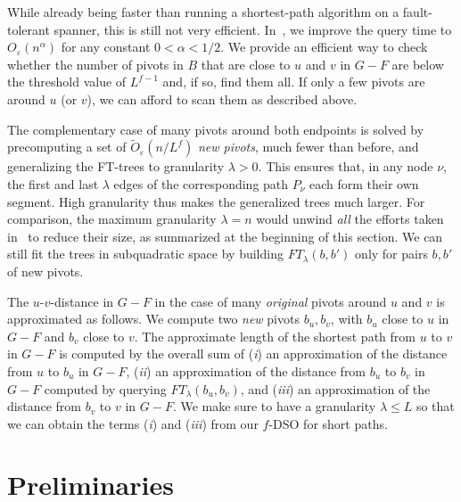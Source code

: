 \documentclass{theoretics}
\newcommand*{\Otilde}{\widetilde{O}}
\renewcommand{\le}{\leqslant}
\newcommand{\eps}{\varepsilon}
\begin{document}
While already being faster than running a shortest-path algorithm 
on a fault-tolerant spanner, this is still not very efficient.
In~, we improve the query time to 
$O_\eps(n^\alpha)$ 
for any constant $0 < \alpha < 1/2$.
We provide an efficient way to check whether the number of pivots in $B$
that are close to $u$ and $v$ in $G-F$ are below the threshold value of $L^{f-1}$
and, if so, find them all. 
If only a few pivots are around $u$ (or $v$),
we can afford to scan them as described above.

The complementary case of many pivots around both endpoints is solved by 
precomputing a set of $\Otilde_\eps(n/L^f)$ \emph{new pivots}, much fewer than before,
and generalizing the FT-trees to granularity $\lambda > 0$.
This ensures that, in any node $\nu$, the first and last $\lambda$ edges 
of the corresponding path $P_\nu$ each form their own segment.
High granularity thus makes the generalized trees much larger.
For comparison, the maximum granularity $\lambda = n$ would unwind \emph{all} the efforts
taken in~\cite{ChCoFiKa17} to reduce their size, as summarized at the beginning of this section.
We can still fit the trees in subquadratic space by building
$FT_\lambda(b,b')$ only for pairs $b,b'$ of new pivots.

The $u$-$v$-distance in $G-F$ in the case of many \emph{original} pivots around $u$ and $v$ is approximated as follows. We compute two \emph{new} pivots $b_u,b_v$,
with $b_u$ close to $u$ in $G-F$ and $b_v$ close to $v$.
The approximate length of the shortest path from $u$ to $v$ in $G-F$ is computed by the overall sum of (\textit{i}) an approximation of the distance from $u$ to $b_u$ in $G-F$, (\textit{ii}) an approximation of the distance from $b_u$ to $b_v$ in $G-F$ computed by querying $FT_\lambda(b_u,b_v)$, and (\textit{iii}) an approximation of the distance from $b_v$ to $v$ in $G-F$.
We make sure to have a granularity $\lambda \le L$ so that we can obtain the terms (\textit{i}) and (\textit{iii})
from our $f$-DSO for short paths.


\section{Preliminaries}
\label{sec:prelims}
\end{document}
